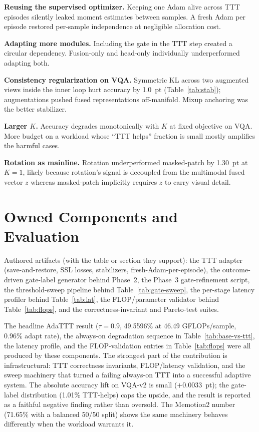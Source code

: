\documentclass[conference]{IEEEtran}
\begin{document}
\textbf{Reusing the supervised optimizer.} Keeping one Adam alive
across TTT episodes silently leaked moment estimates between
samples. A fresh Adam per episode restored per-sample independence
at negligible allocation cost.

\textbf{Adapting more modules.} Including the gate in the TTT step
created a circular dependency. Fusion-only and head-only
individually underperformed adapting both.

\textbf{Consistency regularization on VQA.} Symmetric KL across two
augmented views inside the inner loop hurt accuracy by 1.0~pt
(Table~\ref{tab:stab}); augmentations pushed fused representations
off-manifold. Mixup anchoring was the better stabilizer.

\textbf{Larger $K$.} Accuracy degrades monotonically with $K$ at
fixed objective on VQA. More budget on a workload whose ``TTT
helps'' fraction is small mostly amplifies the harmful cases.

\textbf{Rotation as mainline.} Rotation underperformed masked-patch
by 1.30~pt at $K{=}1$, likely because rotation's signal is
decoupled from the multimodal fused vector $z$ whereas masked-patch
implicitly requires $z$ to carry visual detail.

\section{Owned Components and Evaluation}

Authored artifacts (with the table or section they support):
the TTT adapter (save-and-restore, SSL losses, stabilizers,
fresh-Adam-per-episode), the outcome-driven gate-label generator
behind Phase~2, the Phase~3 gate-refinement script, the
threshold-sweep pipeline behind Table~\ref{tab:gate-sweep}, the
per-stage latency profiler behind Table~\ref{tab:lat}, the
FLOP/parameter validator behind Table~\ref{tab:flops}, and the
correctness-invariant and Pareto-test suites.

The headline AdaTTT result ($\tau{=}0.9$, 49.5596\% at 46.49
GFLOPs/sample, 0.96\% adapt rate), the always-on degradation
sequence in Table~\ref{tab:base-vs-ttt}, the latency profile, and
the FLOP-validation entries in Table~\ref{tab:flops} were all
produced by these components. The strongest part of the contribution
is infrastructural: TTT correctness invariants, FLOP/latency
validation, and the sweep machinery that turned a failing always-on
TTT into a successful adaptive system. The absolute accuracy lift on
VQA-v2 is small ($+0.0033$~pt); the gate-label distribution (1.01\%
TTT-helps) caps the upside, and the result is reported as a faithful
negative finding rather than oversold. The Memotion2 number
(71.65\% with a balanced 50/50 split) shows the same machinery
behaves differently when the workload warrants it.
\end{document}
